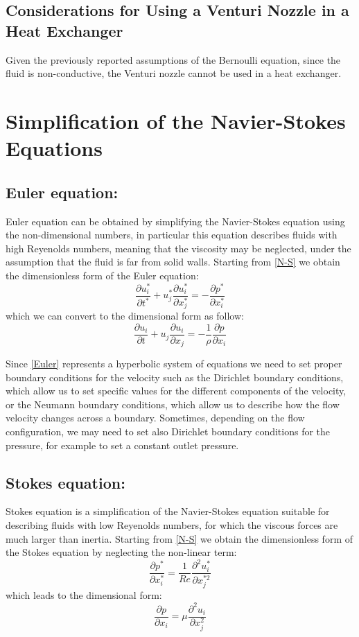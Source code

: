 \documentclass{article}
\begin{document}
\subsection{Considerations for Using a Venturi Nozzle in a Heat Exchanger}

Given the previously reported assumptions of the Bernoulli equation, since the fluid is non-conductive, the Venturi nozzle cannot be used in a heat exchanger.

\section{Simplification of the Navier-Stokes Equations}
\subsection{Euler equation:}
Euler equation can be obtained by simplifying the Navier-Stokes equation using the non-dimensional numbers, in particular this equation describes fluids with high Reyenolds numbers, meaning that the viscosity may be neglected, under the assumption that the fluid is far from solid walls.
Starting from \eqref{N-S} we obtain the dimensionless form of the Euler equation:
\[
    \frac{\partial u_i^*}{\partial t^*} + u_j^* \frac{\partial u_i^*}{\partial x_j^*} = - \frac{\partial p^*}{\partial x_i^*}
\]
which we can convert to the dimensional form as follow:
\begin{equation}
    \frac{\partial u_i}{\partial t} + u_j \frac{\partial u_i}{\partial x_j} = -\frac{1}{\rho} \frac{\partial p}{\partial x_i} \label{Euler}
\end{equation}

Since \eqref{Euler} represents a hyperbolic system of equations we need to set proper boundary conditions for the velocity such as the Dirichlet boundary conditions, which allow us to set specific values for the different components of the velocity, or the Neumann boundary conditions, which allow us to describe how the flow velocity changes across a boundary.
Sometimes, depending on the flow configuration, we may need to set also Dirichlet boundary conditions for the pressure, for example to set a constant outlet pressure.

\subsection{Stokes equation:}
Stokes equation is a simplification of the Navier-Stokes equation suitable for describing fluids with low Reyenolds numbers, for which the viscous forces are much larger than inertia.
Starting from \eqref{N-S} we obtain the dimensionless form of the Stokes equation by neglecting the non-linear term:
\[
    \frac{\partial p^*}{\partial x_i^*} = \frac{1}{Re} \frac{\partial^2 u_i^*}{\partial x_j^{*2}}
\]
which leads to the dimensional form:
\begin{equation}
    \frac{\partial p}{\partial x_i} = \mu \frac{\partial^2 u_i}{\partial x_j^2} \label{Stokes}
\end{equation}
\end{document}
